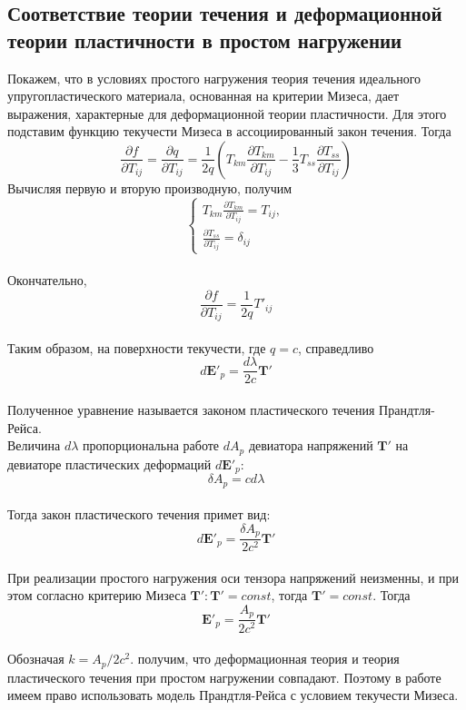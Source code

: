 \documentclass[12pt,a4paper, titlepage, openany]{book}
\begin{document}
\subsection*{Соответствие теории течения и деформационной теории пластичности в простом нагружении}
Покажем, что в условиях простого нагружения теория течения идеального упругопластического материала, основанная на критерии Мизеса, дает выражения, характерные для деформационной теории пластичности. Для этого подставим функцию текучести Мизеса в ассоциированный закон течения. Тогда
\begin{equation}
\frac{\partial f}{\partial T_{ij}} = \frac{\partial q}{\partial T_{ij}} = \frac{1}{2 q} (T_{km} \frac{\partial T_{km}}{\partial T_{ij}} - \frac{1}{3}T_{ss}\frac{\partial T_{ss}}{\partial T_{ij}})
\end{equation}
Вычисляя первую и вторую производную, получим
\begin{equation}
\begin{cases}
T_{km}\frac{\partial T_{km}}{\partial T_{ij}} = T_{ij}, \\
\frac{\partial T_{ss}}{\partial T_{ij}} = \delta_{ij}
\end{cases}
\end{equation}
\\
Окончательно, 
\begin{equation}
\frac{\partial f}{\partial T_{ij}} = \frac{1}{2 q} T'_{ij}
\end{equation}
\\
Таким образом, на поверхности текучести, где $q = c$, справедливо
\begin{equation}
d\mathbf{E'}_p = \frac{d\lambda}{2 c} \mathbf{T'}
\end{equation}
\\
Полученное уравнение называется законом пластического течения Прандтля-Рейса.
\\
Величина $d  \lambda$ пропорциональна работе $d A_p$ девиатора напряжений $\mathbf{T'}$ на девиаторе пластических деформаций $d\mathbf{E'}_p$:
\begin{equation}
\delta A_p = c d\lambda
\end{equation}
\\
Тогда закон пластического течения примет вид:
\begin{equation}
d\mathbf{E'}_p = \frac{\delta A_p}{2 c^2} \mathbf{T'}
\end{equation}
\\
При реализации простого нагружения оси тензора напряжений неизменны, и при этом согласно критерию Мизеса $\mathbf{T'}:\mathbf{T'} = const$, тогда $\mathbf{T'} = const$. Тогда
\begin{equation}
\mathbf{E'}_p = \frac{A_p}{2 c^2}  \mathbf{T'}
\end{equation}
\\
Обозначая $k = A_p/2c^2$. получим, что деформационная теория и теория пластического течения при простом нагружении совпадают. Поэтому в работе имеем право использовать модель Прандтля-Рейса с условием текучести Мизеса.
\end{document}
